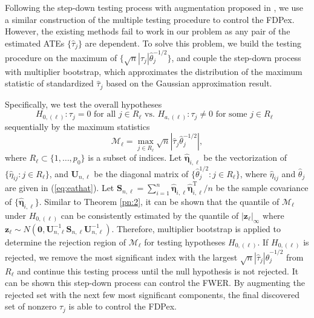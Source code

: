\documentclass[12pt]{article}
\def\be{\begin{equation}}
\def\ee{\end{equation}}
\def\T{{ \mathrm{\scriptscriptstyle T} }}
\theoremstyle{definition}
\newcommand{\bS}{{\mathbf S}}
\newcommand{\bU}{{\mathbf U}}
\newcommand{\bz}{{\mathbf z}}
\newcommand{\bfeta}  {\boldsymbol{\eta}}
\newcommand{\bzero}{{\mathbf 0}}
\begin{document}
Following the step-down testing process with augmentation proposed in \cite{van2004multiple, GW_2006}, we use a similar construction of the multiple testing procedure to control the FDPex. However, the existing methods fail to work in our problem as any pair of the estimated ATEs $\{\hat{\tau}_j\}$ are dependent. To solve this problem, we build the testing procedure on the maximum of $\{\sqrt{n} |\hat{\tau}_{j}| \hat{\theta}_{j}^{-1/2}\}$, and couple the step-down process with multiplier bootstrap, which approximates the distribution of the maximum statistic of standardized $\hat{\tau}_j$ based on the Gaussian approximation result.

Specifically, 
we 
test the overall hypotheses 
$$H_{0, (\ell)}: \tau_{j} = 0 \mbox{ \ for all $j \in R_{\ell}$ vs. \ } 
H_{a, (\ell)}: \tau_j \neq 0 \mbox{ \ for some $j \in R_{\ell}$ }$$
sequentially by the maximum statistics 
\be
\mathcal{M}_{\ell} = \max_{j \in R_{\ell}} \sqrt{n}| \hat{\tau}_{j} \hat{\theta}_{j}^{-1/2} |,
\label{eq:max1}\ee
where $R_{\ell} \subset \{1, \ldots, p_0\}$ is a subset of indices. 
Let $\hat{\bfeta}_{i, \ell}$ be the vectorization of $\{\hat{\eta}_{ij} : j \in R_{\ell}\}$, and $\bU_{n, \ell}$ be the diagonal matrix of $\{\hat{\theta}_{j}^{1/2}: j \in R_\ell\}$, where $\hat{\eta}_{ij}$ and $\hat{\theta}_{j}$ are given in (\ref{eq:eathat}). 
Let $\bS_{n, \ell} = \sum_{i = 1}^{n} \hat{\bfeta}_{i, \ell} \hat{\bfeta}_{i, \ell}^{\T} / n$ be the sample covariance of $\{\hat{\bfeta}_{i, \ell}\}$.
Similar to Theorem \ref{pn:2}, it can be shown that the quantile of $\mathcal{M}_{\ell}$
under $H_{0, (\ell)}$ can be consistently estimated by the quantile of $|\bz_{\ell}|_{\infty}$ where $\bz_{\ell} \sim N(\bzero, \bU_{n, \ell}^{-1} \bS_{n, \ell} \bU_{n, \ell}^{-1})$. Therefore, multiplier bootstrap is applied to determine the rejection region of $\mathcal{M}_{\ell}$
for testing hypotheses $H_{0, (\ell)}$.
If $H_{0, (\ell)}$ is rejected, we remove the most significant index with the largest $\sqrt{n} |\hat{\tau}_{j}| \hat{\theta}_{j}^{-1/2}$ from $R_{\ell}$ and continue this testing process until the null hypothesis is not rejected. 
It can be shown this step-down process can control the FWER. By augmenting the rejected set with the next few most significant components, the final discovered set of nonzero $\tau_j$ is able to control the FDPex. 
\end{document}
